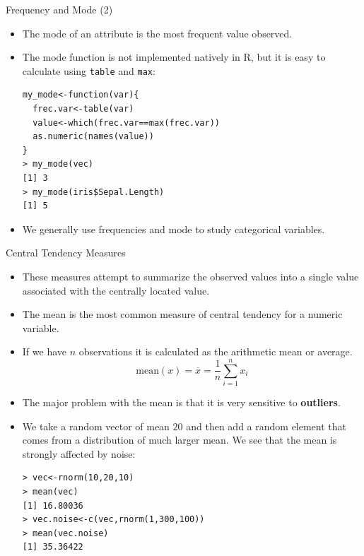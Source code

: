 \documentclass[handout]{beamer}
\begin{document}
\begin{frame}[fragile]{Frequency and Mode (2)}
\scriptsize{
\begin{itemize}
 \item The mode of an attribute is the most frequent value observed.
 \item The mode function is not implemented natively in R, but it is easy to calculate using \verb+table+ and \verb+max+:
 \begin{verbatim}
my_mode<-function(var){
  frec.var<-table(var)
  value<-which(frec.var==max(frec.var))
  as.numeric(names(value))
}
> my_mode(vec)
[1] 3
> my_mode(iris$Sepal.Length)
[1] 5
 \end{verbatim}
 
\item We generally use frequencies and mode to study categorical variables.

\end{itemize}
 

 }
\end{frame}


\begin{frame}[fragile]{Central Tendency Measures}
\scriptsize{
\begin{itemize}
 \item These measures attempt to summarize the observed values into a single value associated with the centrally located value.
 \item The mean is the most common measure of central tendency for a numeric variable.  
 \item If we have $n$ observations it is calculated as the arithmetic mean or average.
 \begin{displaymath}
   \text{mean}(x) = \overline{x} = \frac{1}{n} \sum_{i=1}^{n} x_i
 \end{displaymath}

 \item The major problem with the mean is that it is very sensitive to \textbf{outliers}.
 
 \item We take a random vector of mean $20$ and then add a random element that comes from a distribution of much larger mean.  We see that the mean is strongly affected by noise:
 \begin{verbatim}
> vec<-rnorm(10,20,10)
> mean(vec)
[1] 16.80036
> vec.noise<-c(vec,rnorm(1,300,100))
> mean(vec.noise)
[1] 35.36422
 \end{verbatim}

 
\end{itemize}

 
}
 
\end{frame}
\end{document}

